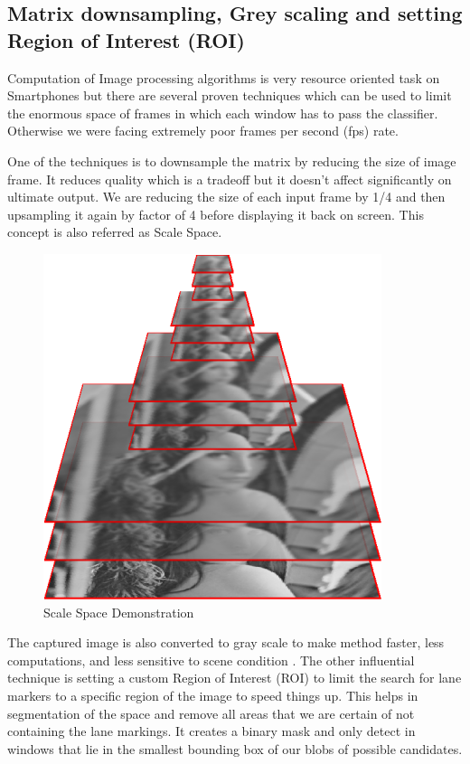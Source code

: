 \subsection{Matrix downsampling, Grey scaling and setting Region of Interest (ROI)}

Computation of Image processing algorithms is very resource oriented task on
Smartphones but there are several proven techniques which can be used to limit
the enormous space of frames in which each window has to pass the classifier. Otherwise we
were facing extremely poor frames per second (fps) rate. 

One of the techniques is to downsample the matrix by reducing the size of image
frame.  It reduces quality which is a tradeoff but it doesn't affect significantly on
ultimate output. We are reducing the size of each input frame by 1/4 and then upsampling it again by
factor of 4 before displaying it back on screen. This concept is also referred as Scale Space.

\begin{figure}[H]
\begin{center}
    \includegraphics[scale=0.6]{img/lane2.png}
\end{center}
\caption{Scale Space Demonstration}
\label{fig:lane2}
\end{figure}

The captured image is also converted to gray scale to make method faster, less
computations, and less sensitive to scene condition \cite{lane2}. The other influential
technique is setting a custom Region of Interest (ROI) to limit the search for
lane markers to a specific region of the image to speed things up. This helps in
segmentation of the space and remove all areas that we are certain of not
containing the lane markings. It creates a binary mask and only detect in
windows that lie in the smallest bounding box of our blobs of possible
candidates.

